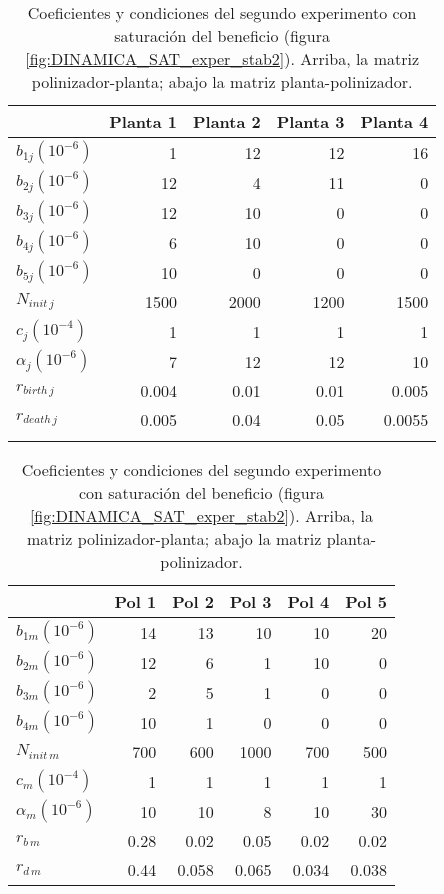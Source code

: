 \begin{table}[hp]
\centering
\footnotesize
\begin{tabular}{lrrrr}
\hline
 & Planta 1 & Planta 2 & Planta 3 & Planta 4  \\
\hline
$b_{1j}${\tiny $\left(10^{-6}\right)$} & 1 & 12 & 12 & 16\\
$b_{2j}${\tiny $\left(10^{-6}\right)$} & 12 & 4 & 11 & 0 \\
$b_{3j}${\tiny $\left(10^{-6}\right)$} & 12 & 10 & 0 & 0 \\
$b_{4j}${\tiny $\left(10^{-6}\right)$} & 6 & 10 & 0 & 0 \\
$b_{5j}${\tiny $\left(10^{-6}\right)$} & 10 & 0 & 0 & 0 \\
$N_{init\,j}$ & 1500 & 2000 & 1200 & 1500 \\
$c_{j}${\tiny $\left(10^{-4}\right)$} & 1 & 1 & 1 & 1 \\
$\alpha_{j}${\tiny $\left(10^{-6}\right)$} & 7 & 12 & 12 & 10 \\
$r_{birth\, j}$ & 0.004 & 0.01 & 0.01 & 0.005 \\
$r_{death\, j}$ & 0.005 & 0.04 & 0.05 & 0.0055 \\
\hline
\\
\end{tabular}
\centering
\begin{tabular}{lrrrrr}
\hline
 &Pol 1&Pol 2&Pol 3&Pol 4&Pol 5\\
\hline
$b_{1m}${\tiny $\left(10^{-6}\right)$}&14&13&10&10&20\\
$b_{2m}${\tiny $\left(10^{-6}\right)$}&12&6&1&10&0\\
$b_{3m}${\tiny $\left(10^{-6}\right)$}&2&5&1&0&0\\
$b_{4m}${\tiny $\left(10^{-6}\right)$}&10&1&0&0&0\\
$N_{init\,m}$ & 700 & 600 & 1000 & 700 & 500 \\
$c_{m}${\tiny $\left(10^{-4}\right)$} & 1 & 1 & 1 & 1 & 1\\
$\alpha_{m}${\tiny $\left(10^{-6}\right)$} & 10 & 10 & 8 & 10 & 30\\
$r_{b\, m}$ & 0.28 & 0.02 & 0.05 & 0.02 & 0.02 \\
$r_{d\, m}$ & 0.44 & 0.058 & 0.065 & 0.034 & 0.038 \\
\hline
\end{tabular}
\normalsize
\caption{Coeficientes y condiciones del segundo experimento con saturación del beneficio (figura \ref{fig:DINAMICA_SAT_exper_stab2}). Arriba, la matriz polinizador-planta; abajo la matriz planta-polinizador.}
\label{tab:SAT_experiment2}
\end{table}

